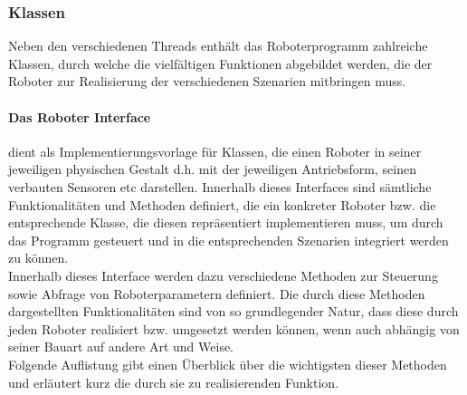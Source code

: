 \subsubsection{Klassen}
Neben den verschiedenen Threads enthält das Roboterprogramm zahlreiche Klassen, durch welche die vielfältigen Funktionen abgebildet 
werden, die der Roboter zur Realisierung der verschiedenen Szenarien mitbringen muss. 
\paragraph{Das Roboter Interface}
dient als Implementierungsvorlage für Klassen, die einen Roboter in seiner jeweiligen physischen Gestalt d.h. mit
der jeweiligen Antriebsform, seinen verbauten Sensoren etc darstellen. Innerhalb dieses Interfaces sind sämtliche Funktionalitäten 
und Methoden definiert, die ein konkreter Roboter bzw. die entsprechende Klasse, die diesen repräsentiert implementieren muss, um durch 
das Programm gesteuert und in die entsprechenden Szenarien integriert werden zu können. \\
Innerhalb dieses Interface werden dazu verschiedene Methoden zur Steuerung sowie Abfrage von Roboterparametern definiert. Die durch 
diese Methoden dargestellten Funktionalitäten sind von so grundlegender Natur, dass diese durch jeden Roboter realisiert bzw. umgesetzt 
werden können, wenn auch abhängig von seiner Bauart auf andere Art und Weise. \\
Folgende Auflistung gibt einen Überblick über die wichtigsten dieser Methoden und erläutert kurz die durch sie zu realisierenden Funktion.
